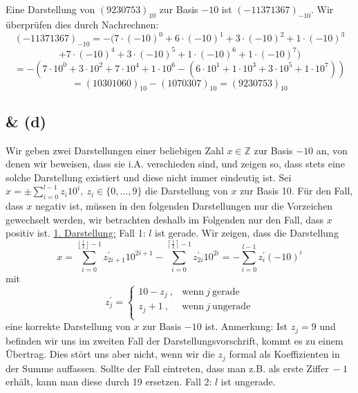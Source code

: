 \documentclass[11pt]{scrartcl}
\theoremstyle{dotless}
\newcommand{\floor}[1]{\left\lfloor #1\right\rfloor}
\newcommand{\ceil}[1]{\left\lceil #1\right\rceil}
\begin{document}
	\subsection{}
		Eine Darstellung von $(9230753)_{10}$ zur Basis $-10$ ist $(-11371367)_{-10}$. Wir überprüfen dies durch Nachrechnen:
		$$(-11371367)_{-10}=-(7\cdot (-10)^0+6\cdot (-10)^1+3\cdot (-10)^2+1\cdot (-10)^3$$$$+7\cdot (-10)^4+3\cdot (-10)^5+1\cdot (-10)^6+1\cdot (-10)^7)$$
		$$=-(7\cdot 10^0+3\cdot 10^2+7\cdot 10^4+1\cdot 10^6-(6\cdot 10^1+1\cdot 10^3+3\cdot 10^5+1\cdot 10^7))$$
		$$=(10301060)_{10}-(1070307)_{10}=(9230753)_{10}$$
	\subsection{\& (d)}
		Wir geben zwei Darstellungen einer beliebigen Zahl $x\in \mathbb{Z}$ zur Basis $-10$ an, von denen wir beweisen, dass sie i.A. verschieden sind, und zeigen so, dass stets eine solche Darstellung existiert und diese nicht immer eindeutig ist.\newline
		Sei $x=\pm\sum_{i=0}^{l-1}z_i10^i,~z_i\in \{0,\dots ,9\}$ die Darstellung von $x$ zur Basis 10. Für den Fall, dass $x$ negativ ist, müssen in den folgenden Darstellungen nur die Vorzeichen gewechselt werden, wir betrachten deshalb im Folgenden nur den Fall, dass $x$ positiv ist.\newline
		\underline{1. Darstellung:}\newline
		Fall 1: $l$ ist gerade.\newline
		Wir zeigen, dass die Darstellung
		$$x=\sum_{i=0}^{\floor{\frac{l}{2}}-1}z_{2i+1}^{\prime} 10^{2i+1}-\sum_{i=0}^{\ceil{\frac{l}{2}}-1}z_{2i}^{\prime} 10^{2i}=-\sum_{i=0}^{l-1}z_{i}^{\prime} (-10)^{i}$$
		mit
		$$z_j^{\prime}=\left\{\begin{array}{ll}
		10-z_j~,& \text{wenn}~j~ \text{gerade}\\
		z_j+1~,&\text{wenn}~j~ \text{ungerade}\\
		\end{array}\right.$$
		eine korrekte Darstellung von $x$ zur Basis $-10$ ist. Anmerkung: Ist $z_j=9$ und befinden wir uns im zweiten Fall der Darstellungsvorschrift, kommt es zu einem \glqq Übertrag\grqq. Dies stört uns aber nicht, wenn wir die $z_j$ formal als Koeffizienten in der Summe auffassen. Sollte der Fall eintreten, dass man z.B. als erste \glqq Ziffer\grqq $~-1$ erhält, kann man diese durch 19 ersetzen.\newline
		Fall 2: $l$ ist ungerade.\newline
\end{document}
